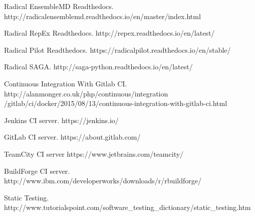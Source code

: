 \documentclass[10pt]{ruthesis}
\begin{document}
\begin{thebibliography}{30}
Radical EnsembleMD Readthedocs.
http://radicalensemblemd.readthedocs.io/en/master/index.html

Radical RepEx Readthedocs.
http://repex.readthedocs.io/en/latest/

Radical Pilot Readthedocs.
https://radicalpilot.readthedocs.io/en/stable/

Radical SAGA.
http://saga-python.readthedocs.io/en/latest/

Continuous Integration With Gitlab CI. http://alanmonger.co.uk/php/continuous/integration
/gitlab/ci/docker/2015/08/13/continuous-integration-with-gitlab-ci.html

Jenkins CI server.
https://jenkins.io/

GitLab CI server.
https://about.gitlab.com/

TeamCity CI server
https://www.jetbrains.com/teamcity/

BuildForge CI server.
http://www.ibm.com/developerworks/downloads/r/rbuildforge/

Static Testing.
http://www.tutorialspoint.com/software\_testing\_dictionary/static\_testing.htm


\end{thebibliography}
\appendix

%

\clearpage

\pagestyle{empty}
%
\end{document}
